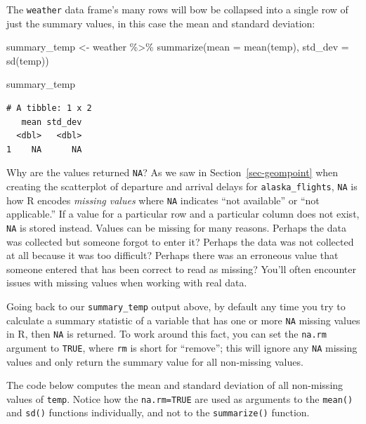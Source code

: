 \documentclass[
  letterpaper,
  DIV=11,
  numbers=noendperiod]{scrreprt}
\newenvironment{Shaded}{\begin{snugshade}}{\end{snugshade}}
\newcommand{\AttributeTok}[1]{\textcolor[rgb]{0.40,0.45,0.13}{#1}}
\newcommand{\FunctionTok}[1]{\textcolor[rgb]{0.28,0.35,0.67}{#1}}
\newcommand{\NormalTok}[1]{\textcolor[rgb]{0.00,0.23,0.31}{#1}}
\newcommand{\OtherTok}[1]{\textcolor[rgb]{0.00,0.23,0.31}{#1}}
\newcommand{\SpecialCharTok}[1]{\textcolor[rgb]{0.37,0.37,0.37}{#1}}
\theoremstyle{definition}
\theoremstyle{remark}
\begin{document}
The \texttt{weather} data frame's many rows will bow be collapsed into a
single row of just the summary values, in this case the mean and
standard deviation:

\begin{Shaded}
\begin{Highlighting}[]
\NormalTok{summary\_temp }\OtherTok{\textless{}{-}}\NormalTok{ weather }\SpecialCharTok{\%\textgreater{}\%} 
  \FunctionTok{summarize}\NormalTok{(}\AttributeTok{mean =} \FunctionTok{mean}\NormalTok{(temp), }\AttributeTok{std\_dev =} \FunctionTok{sd}\NormalTok{(temp))}

\NormalTok{summary\_temp}
\end{Highlighting}
\end{Shaded}

\begin{verbatim}
# A tibble: 1 x 2
   mean std_dev
  <dbl>   <dbl>
1    NA      NA
\end{verbatim}

Why are the values returned \texttt{NA}? As we saw in
Section~\ref{sec-geompoint} when creating the scatterplot of departure
and arrival delays for \texttt{alaska\_flights}, \texttt{NA} is how R
encodes \emph{missing values} where \texttt{NA} indicates ``not
available'' or ``not applicable.'' If a value for a particular row and a
particular column does not exist, \texttt{NA} is stored instead. Values
can be missing for many reasons. Perhaps the data was collected but
someone forgot to enter it? Perhaps the data was not collected at all
because it was too difficult? Perhaps there was an erroneous value that
someone entered that has been correct to read as missing? You'll often
encounter issues with missing values when working with real data.

Going back to our \texttt{summary\_temp} output above, by default any
time you try to calculate a summary statistic of a variable that has one
or more \texttt{NA} missing values in R, then \texttt{NA} is returned.
To work around this fact, you can set the \texttt{na.rm} argument to
\texttt{TRUE}, where \texttt{rm} is short for ``remove''; this will
ignore any \texttt{NA} missing values and only return the summary value
for all non-missing values.

The code below computes the mean and standard deviation of all
non-missing values of \texttt{temp}. Notice how the \texttt{na.rm=TRUE}
are used as arguments to the \texttt{mean()} and \texttt{sd()} functions
individually, and not to the \texttt{summarize()} function.
\end{document}
